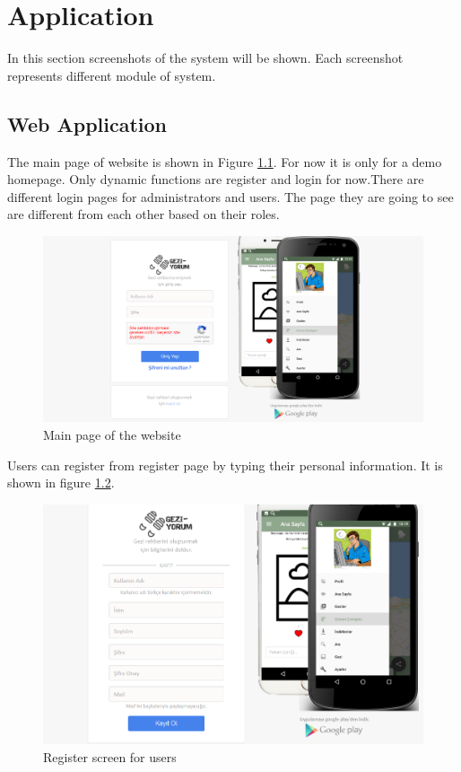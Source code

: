 \chapter{Application}

In this section screenshots of the system will be shown. Each screenshot represents different module of system.

\section{Web Application}

The main page of website is shown in Figure \ref{fig:main1}. For now it is only for a demo homepage. Only dynamic functions are register and login for now.There are different login pages for administrators and users. The page they are going to see are different from each other based on their roles.

\begin{figure}[!htbp]
\centering
\includegraphics[width=\textwidth]{projectChapters/images/main1.png}
\caption{Main page of the website}
\label{fig:main1}
\end{figure}

\newpage

Users can register from register page by typing their personal information. It is shown in figure  \ref{fig:registerWeb}. 

\begin{figure}[!htbp]
\centering
\includegraphics[width=\textwidth]{projectChapters/images/main2.png}
\caption{Register screen for users}
\label{fig:registerWeb}
\end{figure}


